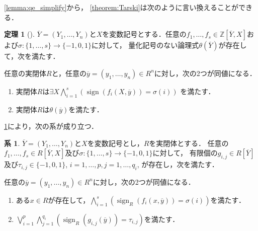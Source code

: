 \documentclass[uplatex, dvipdfmx]{jsarticle}
\numberwithin{equation}{section}
\newcommand{\Z}{\mathbb{Z}}
\newcommand{\map}[3]{{#1}\colon{#2}\rightarrow{#3}}
\DeclareMathOperator{\sign}{sign}
\theoremstyle{definition}
\newtheorem{theorem}[definition]{定理}
\newtheorem{corollary}[definition]{系}
\begin{document}
\cref{lemma:qe_simplify}から，
\cref{theorem:Tarski}は次のように言い換えることができる．

\begin{theorem}[{\cite[Theorem 1.4.2]{MR1659509}}]\label{theorem:weak_Tarski}
     $\overline{Y} = (Y_1, \dots, Y_n)$と$X$を変数記号とする．任意の$f_1, \dots, f_s \in \Z\left[ \overline{Y},X \right]$および$\map{\sigma}{\{1, \dots, s\}}{\{-1, 0, 1\}}$に対して，
     量化記号のない論理式$\theta\left(\overline{Y}\right)$が存在して，次を満たす．

     任意の実閉体$R$と，任意の$\overline{y} = (y_1, \dots, y_n) \in R^n$に対し，次の2つが同値になる．
     \begin{enumerate}
          \item 実閉体$R$は$\exists X \bigwedge_{i=1}^s (\sign(f_i(X,\overline{y})) = \sigma(i))$ を満たす．
          \item 実閉体$R$は$\theta\left(\overline{y}\right)$を満たす．
     \end{enumerate}
\end{theorem}

\cref{theorem:weak_Tarski}により，次の系が成り立つ．
\begin{corollary}\label{corollary:weak_Tarski}
     $\overline{Y} = (Y_1, \dots, Y_n)$と$X$を変数記号とし，$R$を実閉体とする．
     任意の$f_1, \dots, f_s \in R\left[\overline{Y}, X\right]$及び$\map{\sigma}{\{1, \dots, s\}}{\{-1,0,1\}}$に対して，
     有限個の$g_{i,j} \in R\left[\overline{Y}\right]$及び$\tau_{i,j} \in \{-1, 0, 1\}$, $i=1, \dots, p, j=1, \dots, q_i$, が存在し，次を満たす．

     任意の$\overline{y} = (y_1, \dots, y_n) \in R^n$に対し，次の2つが同値になる．
     \begin{enumerate}
          \item ある$x \in R$が存在して，$\bigwedge_{i=1}^s (\sign_R(f_i(x, \overline{y})) = \sigma(i))$を満たす．
          \item $\bigvee_{i=1}^p \bigwedge_{j=1}^{q_i} (\sign_R(g_{i,j}(\overline{y})) = \tau_{i,j})$を満たす．
     \end{enumerate}
\end{corollary}
\end{document}
